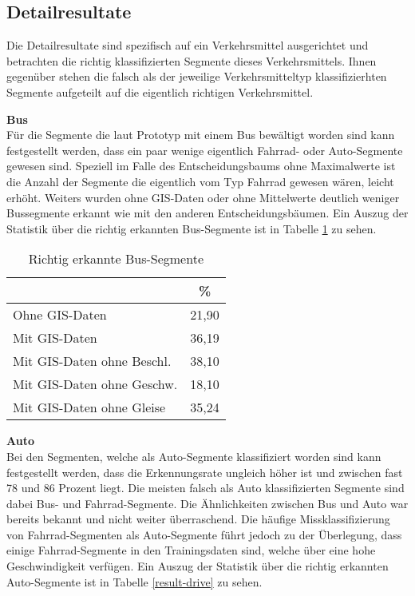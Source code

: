 \subsection{Detailresultate}
Die Detailresultate sind spezifisch auf ein Verkehrsmittel ausgerichtet und betrachten die richtig klassifizierten Segmente dieses Verkehrsmittels. Ihnen gegenüber stehen die falsch als der jeweilige Verkehrsmitteltyp klassifizierhten Segmente aufgeteilt auf die eigentlich richtigen Verkehrsmittel.

\textbf{Bus} \\
Für die Segmente die laut Prototyp mit einem Bus bewältigt worden sind kann festgestellt werden, dass ein paar wenige eigentlich Fahrrad- oder Auto-Segmente gewesen sind. Speziell im Falle des Entscheidungsbaums ohne Maximalwerte ist die Anzahl der Segmente die eigentlich vom Typ Fahrrad gewesen wären, leicht erhöht. Weiters wurden ohne GIS-Daten oder ohne Mittelwerte deutlich weniger Bussegmente erkannt wie mit den anderen Entscheidungsbäumen. Ein Auszug der Statistik über die richtig erkannten Bus-Segmente ist in Tabelle \ref{result-bus} zu sehen.

\begin{table}[h]
\centering
\begin{tabular}{|l|c|}
\hline
 & \% \\ \hline
Ohne GIS-Daten & 21,90 \\ \hline
Mit GIS-Daten & 36,19 \\ \hline
Mit GIS-Daten ohne Beschl. & 38,10 \\ \hline
Mit GIS-Daten ohne Geschw. & 18,10 \\ \hline
Mit GIS-Daten ohne Gleise & 35,24 \\ \hline
\end{tabular}
\caption{Richtig erkannte Bus-Segmente}
\label{result-bus}
\end{table}

\textbf{Auto} \\
Bei den Segmenten, welche als Auto-Segmente klassifiziert worden sind kann festgestellt werden, dass die Erkennungsrate ungleich höher ist und zwischen fast 78 und 86 Prozent liegt. Die meisten falsch als Auto klassifizierten Segmente sind dabei Bus- und Fahrrad-Segmente. Die Ähnlichkeiten zwischen Bus und Auto war bereits bekannt und nicht weiter überraschend. Die häufige Missklassifizierung von Fahrrad-Segmenten als Auto-Segmente führt jedoch zu der Überlegung, dass einige Fahrrad-Segmente in den Trainingsdaten sind, welche über eine hohe Geschwindigkeit verfügen. Ein Auszug der Statistik über die richtig erkannten Auto-Segmente ist in Tabelle \ref{result-drive} zu sehen.

